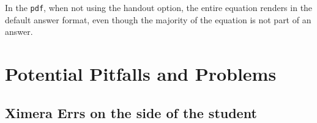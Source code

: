 \documentclass{ximera}
\begin{document}
        In the \verb|pdf|, when not using the handout option, the entire equation renders in the default answer format, even though the majority of the equation is not part of an answer.

    
            
        
        
        
    
    \section{Potential Pitfalls and Problems}    
    
        \subsection*{Ximera Errs on the side of the student}
        
\end{document}
